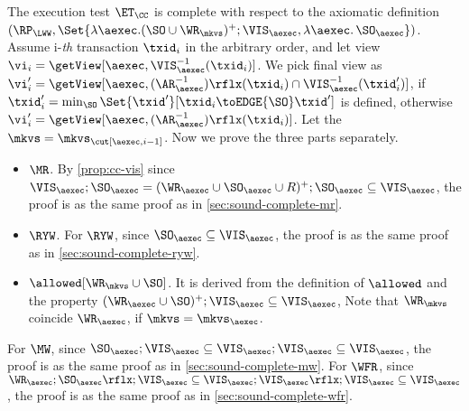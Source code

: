 The execution test $\ET_\CC$ is complete with respect to the axiomatic definition 
\( (\RP_{\LWW}, \Set{\lambda \aexec.  (\SO \cup \WR_{\mkvs})^{+} ; \VIS_{\aexec}, \lambda \aexec \ldotp \SO_\aexec })\).
Assume i-\emph{th} transaction \( \txid_i \) in the arbitrary order,
and let view \( \vi_{i} = \getView[\aexec, \VIS^{-1}_{\aexec}(\txid_{i})] \).
We pick final view as \( \vi'_{i} = \getView[\aexec, (\AR^{-1}_{\aexec})\rflx(\txid_{i}) \cap \VIS_{\aexec}^{-1}(\txid'_i)] \),
if \( \txid'_i = \min_{\SO}\Set{\txid'}[\txid_i \toEDGE{\SO} \txid' ]\) is defined,
otherwise  \( \vi'_{i} = \getView[\aexec, (\AR^{-1}_{\aexec})\rflx(\txid_{i})]\).
Let the \( \mkvs = \mkvs_{\cut[\aexec, i-1]} \).
Now we prove the three parts separately.
\begin{itemize}
    \item \( \MR \).  By \cref{prop:cc-vis} since 
    \(  \VIS_\aexec ; \SO_\aexec = (\WR_\aexec \cup \SO_\aexec \cup R)^{+} ; \SO_\aexec \subseteq \VIS_{\aexec} \),
    the proof is as the same proof as in \cref{sec:sound-complete-mr}.
    \item \( \RYW \). For \( \RYW \), since \( \SO_\aexec \subseteq \VIS_\aexec \), 
    the proof is as the same proof as in \cref{sec:sound-complete-ryw}.
    \item  \( \allowed[\WR_\mkvs \cup \SO]\). It is derived from 
    the definition of \( \allowed \) and 
    the property  \( (\WR_\aexec \cup \SO)^{+} ; \VIS_\aexec \subseteq \VIS_\aexec \),
    Note that \( \WR_\mkvs \) coincide  \( \WR_\aexec \), if \( \mkvs = \mkvs_\aexec\).
\end{itemize}

For \( \MW \), since \( \SO_\aexec ; \VIS_\aexec \subseteq  \VIS_\aexec ; \VIS_{\aexec} \subseteq \VIS_\aexec \),
the proof is as the same proof as in \cref{sec:sound-complete-mw}.
For \( \WFR \), since \( \WR_\aexec ; \SO_\aexec\rflx ; \VIS_\aexec \subseteq \VIS_\aexec ; \VIS_{\aexec}\rflx ; \VIS_\aexec \subseteq \VIS_\aexec \),
the proof is as the same proof as in \cref{sec:sound-complete-wfr}.
